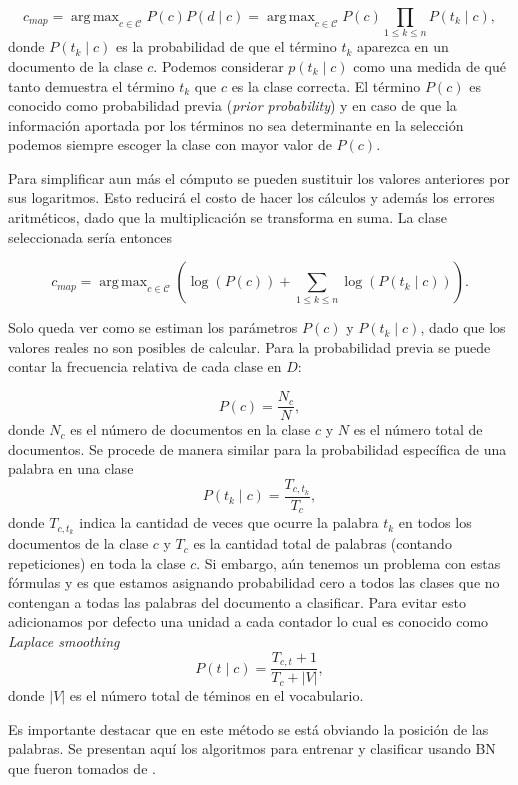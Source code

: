 \documentclass{llncs}
\DeclareMathOperator*{\argmax}{arg\,max}
\begin{document}
		\[
			c_{map} = \argmax_{c\in\mathcal{C}} P(c) P(d \mid c) = \argmax_{c\in\mathcal{C}} P(c) \prod_{1\leq k\leq n} P(t_k \mid c),
		\]
		donde $P(t_k \mid c)$ es la probabilidad de que el t\'ermino $t_k$ aparezca en un documento de la clase $c$. Podemos considerar $p(t_k \mid c)$ como una medida de qu\'e tanto demuestra el t\'ermino $t_k$ que $c$ es la clase correcta. El t\'ermino $P(c)$ es conocido como probabilidad previa (\emph{prior probability}) y en caso de que la informaci\'on aportada por los t\'erminos no sea determinante en la selecci\'on podemos siempre escoger la clase con mayor valor de $P(c)$.
		
		Para simplificar aun m\'as el c\'omputo se pueden sustituir los valores anteriores por sus logaritmos. Esto reducir\'a el costo de hacer los c\'alculos y adem\'as los errores aritm\'eticos, dado que la multiplicaci\'on se transforma en suma. La clase seleccionada ser\'ia entonces
		
		\[
				c_{map} = \argmax_{c\in\mathcal{C}} \left( \log(P(c))  + \sum_{1\leq k\leq n} \log(P(t_k\mid c)) \right).
		\]
		
		Solo queda ver como se estiman los par\'ametros $P(c)$ y $P (t_k\mid c)$, dado que los valores reales no son posibles de calcular.	Para la probabilidad previa se puede contar la frecuencia relativa de cada clase en $D$:
		
		\[P(c) = \frac{ N_c }{N} , \]
		donde $N_c$ es el n\'umero de documentos en la clase $c$ y $N$ es el n\'umero total de documentos. Se procede de manera similar para la probabilidad espec\'ifica de una palabra en una clase
		\[
			P(t_k\mid c) =\frac{ T_{c,t_k}}{T_{c}},
		\]
		donde $T_{c,t_k}$ indica la cantidad de veces que ocurre  la palabra $t_k$ en todos los documentos de la clase $c$ y $T_{c}$ es la cantidad total de palabras (contando repeticiones) en toda la clase $c$. Si embargo, a\'un tenemos un problema con estas f\'ormulas y es que estamos asignando probabilidad cero a todos las clases que no contengan a todas las palabras del documento a clasificar. Para evitar esto adicionamos por defecto una unidad a cada contador lo cual es conocido como \emph{Laplace smoothing}
		\[
			P(t\mid c) = \frac{T_{c,t} + 1}{T_c + |V|},	
		\]
		donde $|V|$ es el n\'umero total de t\'eminos en el vocabulario.
		
		 Es importante destacar que en este m\'etodo se est\'a obviando la posici\'on de las palabras. Se presentan aqu\'i los algoritmos para entrenar y clasificar usando BN que fueron tomados de \cite[Figure $13.2$]{B1}.
		 
\end{document}

